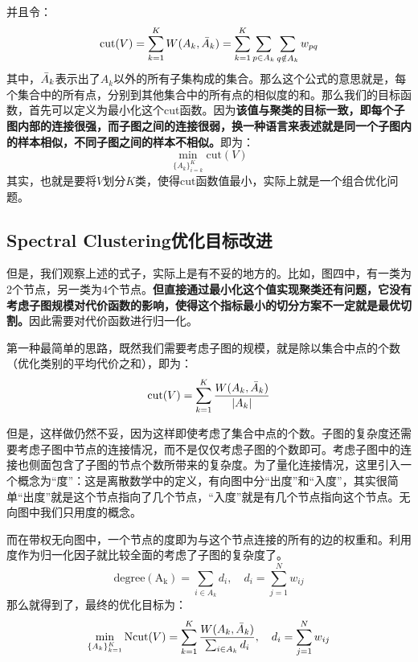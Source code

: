 \documentclass[a4paper]{article}
\begin{document}
并且令：
\begin{equation}
    \mathrm{cut}(V) = \sum_{k=1}^K W(A_k,\Bar{A}_k) = \sum_{k=1}^K \sum_{p\in A_k} \sum_{q\notin A_k} w_{pq}
\end{equation}
其中，$\Bar{A}_k$表示出了$A_k$以外的所有子集构成的集合。那么这个公式的意思就是，每个集合中的所有点，分别到其他集合中的所有点的相似度的和。那么我们的目标函数，首先可以定义为最小化这个cut函数。因为\textbf{该值与聚类的目标一致，即每个子图内部的连接很强，而子图之间的连接很弱，换一种语言来表述就是同一个子图内的样本相似，不同子图之间的样本不相似。}即为：
\begin{equation}
    \min_{\{A_k\}_{i=k}^K}\mathrm{cut}(V)
\end{equation}
其实，也就是要将$V$划分$K$类，使得$\mathrm{cut}$函数值最小，实际上就是一个组合优化问题。

\subsection{Spectral Clustering优化目标改进}
但是，我们观察上述的式子，实际上是有不妥的地方的。比如，图四中，有一类为2个节点，另一类为4个节点。\textbf{但直接通过最小化这个值实现聚类还有问题，它没有考虑子图规模对代价函数的影响，使得这个指标最小的切分方案不一定就是最优切割。}因此需要对代价函数进行归一化。

第一种最简单的思路，既然我们需要考虑子图的规模，就是除以集合中点的个数（优化类别的平均代价之和），即为：
\begin{equation}
    \mathrm{cut}(V) = \sum_{k=1}^K \frac{W(A_k,\Bar{A}_k)}{|A_k|}
\end{equation}

但是，这样做仍然不妥，因为这样即使考虑了集合中点的个数。子图的复杂度还需要考虑子图中节点的连接情况，而不是仅仅考虑子图的个数即可。考虑子图中的连接也侧面包含了子图的节点个数所带来的复杂度。为了量化连接情况，这里引入一个概念为“度”：这是离散数学中的定义，有向图中分“出度”和“入度”，其实很简单“出度”就是这个节点指向了几个节点，“入度”就是有几个节点指向这个节点。无向图中我们只用度的概念。

而在带权无向图中，一个节点的度即为与这个节点连接的所有的边的权重和。利用度作为归一化因子就比较全面的考虑了子图的复杂度了。
\begin{equation}
    \mathrm{degree(A_k)} = \sum_{i\in A_k} d_i,\quad d_i = \sum_{j=1}^N w_{ij}
\end{equation}
那么就得到了，最终的优化目标为：
\begin{equation}
    \min_{\{A_k\}_{k=1}^K} \mathrm{Ncut}(V) = \sum_{k=1}^K\frac{ W(A_k,\Bar{A}_k)}{\sum_{i\in A_k} d_i} ,\quad d_i = \sum_{j=1}^N w_{ij}
\end{equation}
\end{document}

